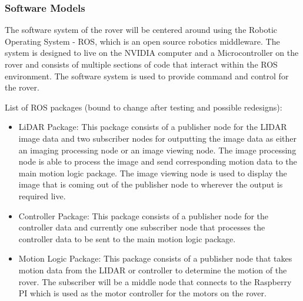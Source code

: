 \documentclass[a4paper, 10pt]{article}
\begin{document}
 		\subsubsection{Software Models}
 		The software system of the rover will be centered around using the Robotic Operating System - ROS, which is an open source robotics middleware. The system is designed to live on the NVIDIA computer and a Microcontroller on the rover and consists of multiple sections of code that interact within the ROS environment. The software system is used to provide command and control for the rover. 

		List of ROS packages (bound to change after testing and possible redesigns):
			\begin{itemize}
				\item{LiDAR Package:}
				This package consists of a publisher node for the LIDAR image data and two subscriber nodes for outputting the image data as either an imaging processing node or an image viewing node. The image processing node is able to process the image and send corresponding motion data to the main motion logic package. The image viewing node is used to display the image that is coming out of the publisher node to wherever the output is required live.
			
				\item{Controller Package:}
				This package consists of a publisher node for the controller data and currently one subscriber node that processes the controller data to be sent to the main motion logic package.
			
				\item{Motion Logic Package:}
				This package consists of a publisher node that takes motion data from the LIDAR or controller to determine the motion of the rover. The subscriber will be a middle node that connects to the Raspberry PI which is used as the motor controller for the motors on the rover.
			\end{itemize}
\end{document}
